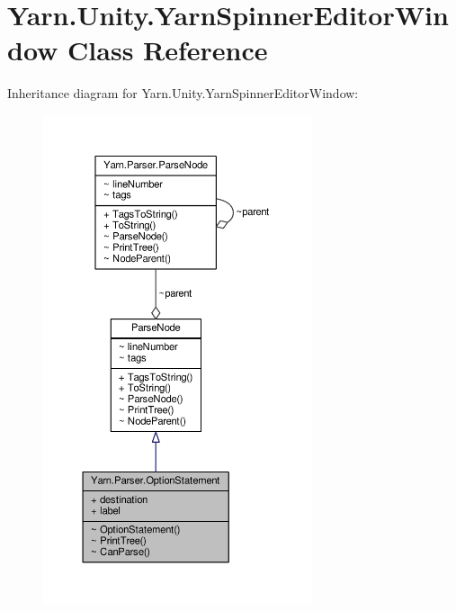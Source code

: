 \hypertarget{a00164}{\section{Yarn.\-Unity.\-Yarn\-Spinner\-Editor\-Window Class Reference}
\label{a00164}
}


Inheritance diagram for Yarn.\-Unity.\-Yarn\-Spinner\-Editor\-Window\-:
\nopagebreak
\begin{figure}[H]
\begin{center}
\leavevmode
\includegraphics[width=224pt]{a00698}
\end{center}
\end{figure}


